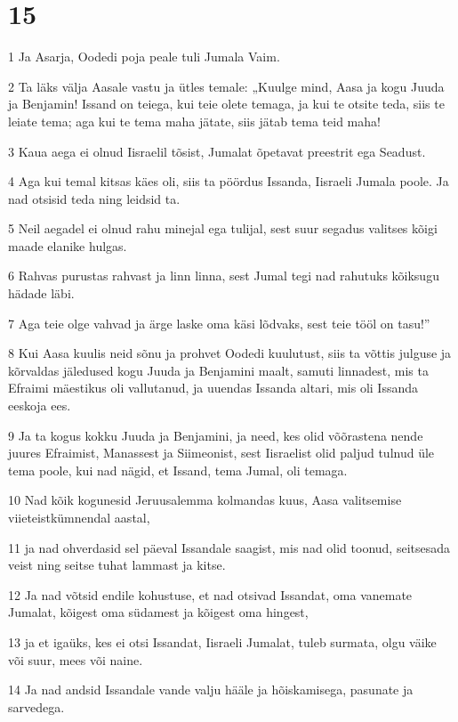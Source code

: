 \chapter{15}

\par 1 Ja Asarja, Oodedi poja peale tuli Jumala Vaim.
\par 2 Ta läks välja Aasale vastu ja ütles temale: „Kuulge mind, Aasa ja kogu Juuda ja Benjamin! Issand on teiega, kui teie olete temaga, ja kui te otsite teda, siis te leiate tema; aga kui te tema maha jätate, siis jätab tema teid maha!
\par 3 Kaua aega ei olnud Iisraelil tõsist, Jumalat õpetavat preestrit ega Seadust.
\par 4 Aga kui temal kitsas käes oli, siis ta pöördus Issanda, Iisraeli Jumala poole. Ja nad otsisid teda ning leidsid ta.
\par 5 Neil aegadel ei olnud rahu minejal ega tulijal, sest suur segadus valitses kõigi maade elanike hulgas.
\par 6 Rahvas purustas rahvast ja linn linna, sest Jumal tegi nad rahutuks kõiksugu hädade läbi.
\par 7 Aga teie olge vahvad ja ärge laske oma käsi lõdvaks, sest teie tööl on tasu!”
\par 8 Kui Aasa kuulis neid sõnu ja prohvet Oodedi kuulutust, siis ta võttis julguse ja kõrvaldas jäledused kogu Juuda ja Benjamini maalt, samuti linnadest, mis ta Efraimi mäestikus oli vallutanud, ja uuendas Issanda altari, mis oli Issanda eeskoja ees.
\par 9 Ja ta kogus kokku Juuda ja Benjamini, ja need, kes olid võõrastena nende juures Efraimist, Manassest ja Siimeonist, sest Iisraelist olid paljud tulnud üle tema poole, kui nad nägid, et Issand, tema Jumal, oli temaga.
\par 10 Nad kõik kogunesid Jeruusalemma kolmandas kuus, Aasa valitsemise viieteistkümnendal aastal,
\par 11 ja nad ohverdasid sel päeval Issandale saagist, mis nad olid toonud, seitsesada veist ning seitse tuhat lammast ja kitse.
\par 12 Ja nad võtsid endile kohustuse, et nad otsivad Issandat, oma vanemate Jumalat, kõigest oma südamest ja kõigest oma hingest,
\par 13 ja et igaüks, kes ei otsi Issandat, Iisraeli Jumalat, tuleb surmata, olgu väike või suur, mees või naine.
\par 14 Ja nad andsid Issandale vande valju hääle ja hõiskamisega, pasunate ja sarvedega.
